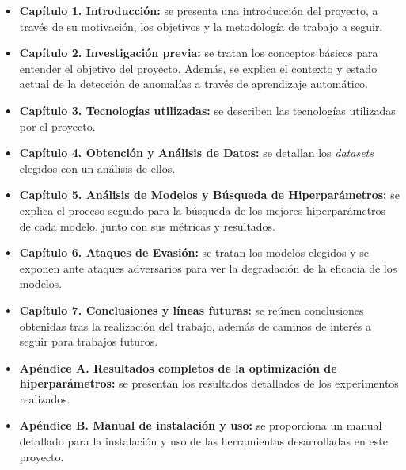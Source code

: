 \begin{itemize}
    \item \textbf{Capítulo 1. Introducción: } se presenta una introducción del proyecto, a través de su motivación, los objetivos y la metodología de trabajo a seguir.
    \item \textbf{Capítulo 2. Investigación previa: } se tratan los conceptos básicos para entender el objetivo del proyecto. Además, se explica el contexto y estado actual de la detección de anomalías a través de aprendizaje automático.
    \item \textbf{Capítulo 3. Tecnologías utilizadas: } se describen las tecnologías utilizadas por el proyecto. 
    \item \textbf{Capítulo 4. Obtención y Análisis de Datos: } se detallan los \textit{datasets} elegidos con un análisis de ellos.
    \item \textbf{Capítulo 5. Análisis de Modelos y Búsqueda de Hiperparámetros: } se explica el proceso seguido para la búsqueda de los mejores hiperparámetros de cada modelo, junto con sus métricas y resultados.
    \item \textbf{Capítulo 6. Ataques de Evasión: } se tratan los modelos elegidos y se exponen ante ataques adversarios para ver la degradación de la eficacia de los modelos.
    \item \textbf{Capítulo 7. Conclusiones y líneas futuras: } se reúnen conclusiones obtenidas tras la realización del trabajo, además de caminos de interés a seguir para trabajos futuros.
    \item \textbf{Apéndice A. Resultados completos de la optimización de hiperparámetros: } se presentan los resultados detallados de los experimentos realizados.
    \item \textbf{Apéndice B. Manual de instalación y uso: } se proporciona un manual detallado para la instalación y uso de las herramientas desarrolladas en este proyecto.
\end{itemize}